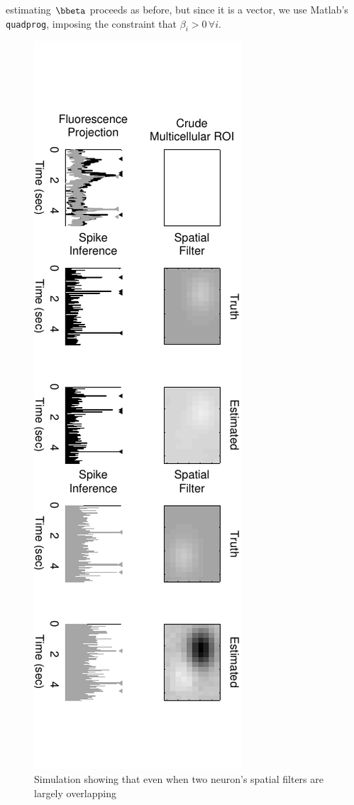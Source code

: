 estimating $\bbeta$ proceeds as before, but since it is a vector, we use Matlab's \texttt{quadprog}, imposing the constraint that $\beta_i>0 \, \forall i$.

\begin{figure}[h!]
\centering \includegraphics[width=.9\linewidth]{../figs/spatial_multi}
\caption{Simulation showing that even when two neuron's spatial filters are largely overlapping} \label{fig:spatial_multi}
\end{figure}


